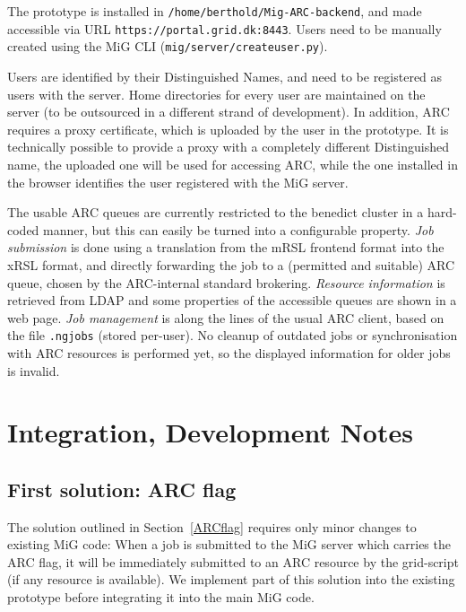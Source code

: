 \documentclass[11pt]{article}
\begin{document}
The prototype is installed in \texttt{/home/berthold/Mig-ARC-backend},
and made accessible via URL \verb!https://portal.grid.dk:8443!. Users
need to be manually created using the MiG CLI
(\texttt{mig/server/createuser.py}).

Users are identified by their Distinguished Names, and need to be
registered as users with the server. Home directories for every user
are maintained on the server (to be outsourced in a different strand
of development). In addition, ARC requires a proxy certificate, which
is uploaded by the user in the prototype. It is technically possible
to provide a proxy with a completely different Distinguished name, the
uploaded one will be used for accessing ARC, while the one installed
in the browser identifies the user registered with the MiG server.

The usable ARC queues are currently restricted to the benedict cluster
in a hard-coded manner, but this can easily be turned into a
configurable property.
%
\emph{Job submission} is done using a translation from the mRSL
frontend format into the xRSL format, and directly forwarding the job
to a (permitted and suitable) ARC queue, chosen by the ARC-internal
standard brokering. \emph{Resource information} is retrieved from LDAP
and some properties of the accessible queues are shown in a web
page. \emph{Job management} is along the lines of the usual ARC
client, based on the file \texttt{.ngjobs} (stored per-user). No
cleanup of outdated jobs or synchronisation with ARC resources is
performed yet, so the displayed information for older jobs is invalid.



\section{Integration, Development Notes}

\subsection{First solution: ARC flag}
The solution outlined in Section~\ref{ARCflag} requires only minor
changes to existing MiG code: When a job is submitted to the MiG
server which carries the ARC flag, it will be immediately submitted to
an ARC resource by the grid-script (if any resource is available). We
implement part of this solution into the existing prototype before
integrating it into the main MiG code.
\end{document}
